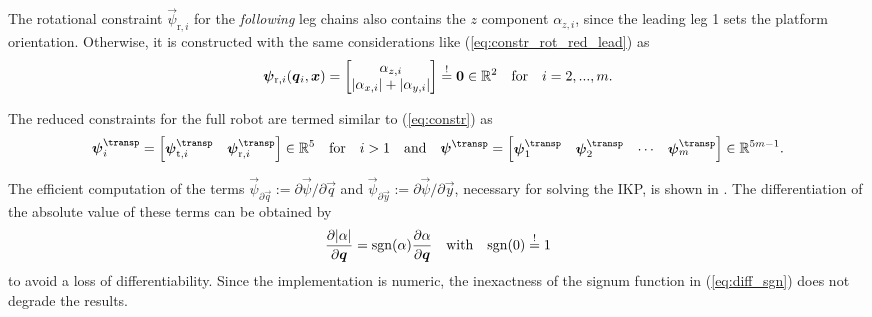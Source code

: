 \documentclass[
	graybox,
	vecphys] %
	{svmult}
\newcommand{\vecResR}[0]{\vec{\psi}}
\begin{document}
The rotational constraint $\vecResR_{\mathrm{r},i}$ for the \emph{following} leg chains also contains the $z$ component $\alpha_{z,i}$, since the leading leg 1 sets the platform orientation.
Otherwise, it is constructed with the same considerations like (\ref{eq:constr_rot_red_lead}) as
%
\begin{equation}
\vecResR_{\mathrm{r},i}(\vec{q}_i,\vec{x})
=
\begin{bmatrix}
\alpha_{z,i} \\
|\alpha_{x,i}| + |\alpha_{y,i}|
\end{bmatrix} 
\overset{!}{=}
\vec{0}
\in {\mathbb{R}}^{2}
\quad \mathrm{for} \quad i=2,...,m.
\label{eq:constr_rot_red_follow}
\vspace{-0.1cm}
\end{equation}


The reduced constraints for the full robot are termed similar to (\ref{eq:constr}) as
%
\vspace{-0.1cm}
\begin{equation}
\vecResR_i^\transp=\begin{bmatrix}
\vecResR_{\mathrm{t},i}^\transp & \vecResR_{\mathrm{r},i}^\transp
\end{bmatrix} \in {\mathbb{R}}^{5}
\quad \mathrm{for} \quad i>1
\quad \mathrm{and} \quad
\vecResR^\transp
=
\begin{bmatrix}
\vecResR_1^\transp &
\vecResR_2^\transp &
\cdots &
\vecResR_m^\transp
\end{bmatrix} \in {\mathbb{R}}^{5m-1}.
\label{eq:constr_red}
\vspace{-0.1cm}
\end{equation}




The efficient computation of the 
terms $\vecResR_{\partial \vec{q}}{:=}\partial  \vecResR / \partial \vec{q}$ %
and
$\vecResR_{\partial \vec{y}}{:=}\partial \vecResR / \partial \vec{y}$,
necessary for solving the IKP,
is shown in \cite{SchapplerTapOrt2019}.
The differentiation of the absolute value of these terms can be obtained by %
%
\vspace{-0.1cm}
\begin{equation}
\frac{\partial |\alpha|}{\partial \vec{q}}=\mathrm{sgn}(\alpha)\frac{\partial \alpha}{\partial \vec{q}}
\quad \mathrm{with} \quad
\mathrm{sgn}(0) \overset{!}{=} 1
\label{eq:diff_sgn}
\vspace{-0.1cm}
\end{equation}
%
to avoid a loss of differentiability.
Since the implementation is numeric, the inexactness of the signum function in (\ref{eq:diff_sgn}) does not degrade the results.
\end{document}
